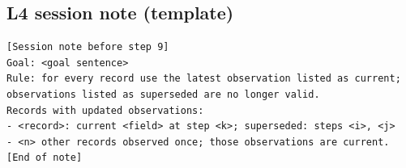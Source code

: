 \subsection{L4 session note (template)}
\begin{small}\begin{verbatim}
[Session note before step 9]
Goal: <goal sentence>
Rule: for every record use the latest observation listed as current; observations listed as superseded are no longer valid.
Records with updated observations:
- <record>: current <field> at step <k>; superseded: steps <i>, <j>
- <n> other records observed once; those observations are current.
[End of note]


\end{verbatim}\end{small}
